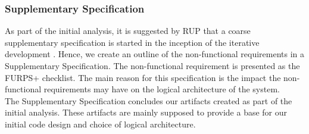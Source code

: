 \subsubsection{Supplementary Specification}
As part of the initial analysis, it is suggested by RUP that a coarse supplementary specification is started in the inception of the iterative development \cite[7.1 p.~102]{OOAD}. Hence, we create an outline of the non-functional requirements in a Supplementary Specification. The non-functional requirement is presented as the FURPS+ checklist. The main reason for this specification is the impact the non-functional requirements may have on the logical architecture of the system.\\
\newline
The Supplementary Specification concludes our artifacts created as part of the initial analysis. These artifacts are mainly supposed to provide a base for our initial code design and choice of logical architecture.\\